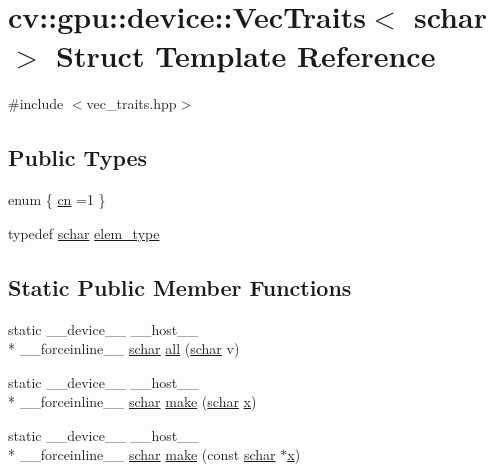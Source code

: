 \hypertarget{structcv_1_1gpu_1_1device_1_1VecTraits_3_01schar_01_4}{\section{cv\-:\-:gpu\-:\-:device\-:\-:Vec\-Traits$<$ schar $>$ Struct Template Reference}
\label{structcv_1_1gpu_1_1device_1_1VecTraits_3_01schar_01_4}
}


{\ttfamily \#include $<$vec\-\_\-traits.\-hpp$>$}

\subsection*{Public Types}
\begin{DoxyCompactItemize}
\item 
enum \{ \hyperlink{structcv_1_1gpu_1_1device_1_1VecTraits_3_01schar_01_4_a23539070e1678601e74686b53e4a974ba37e2cd4dde4f874a49c42458faa85b98}{cn} =1
 \}
\item 
typedef \hyperlink{core_2types__c_8h_a0fd9ce9d735064461bebfe6037026093}{schar} \hyperlink{structcv_1_1gpu_1_1device_1_1VecTraits_3_01schar_01_4_a70d72b11f7b0a4f9704e419f856d35ab}{elem\-\_\-type}
\end{DoxyCompactItemize}
\subsection*{Static Public Member Functions}
\begin{DoxyCompactItemize}
\item 
static \-\_\-\-\_\-device\-\_\-\-\_\- \-\_\-\-\_\-host\-\_\-\-\_\- \\*
\-\_\-\-\_\-forceinline\-\_\-\-\_\- \hyperlink{core_2types__c_8h_a0fd9ce9d735064461bebfe6037026093}{schar} \hyperlink{structcv_1_1gpu_1_1device_1_1VecTraits_3_01schar_01_4_afaaa65cdee3a079da18176f9945e083e}{all} (\hyperlink{core_2types__c_8h_a0fd9ce9d735064461bebfe6037026093}{schar} v)
\item 
static \-\_\-\-\_\-device\-\_\-\-\_\- \-\_\-\-\_\-host\-\_\-\-\_\- \\*
\-\_\-\-\_\-forceinline\-\_\-\-\_\- \hyperlink{core_2types__c_8h_a0fd9ce9d735064461bebfe6037026093}{schar} \hyperlink{structcv_1_1gpu_1_1device_1_1VecTraits_3_01schar_01_4_ac362bca856170d646aa2b40cee7f543f}{make} (\hyperlink{core_2types__c_8h_a0fd9ce9d735064461bebfe6037026093}{schar} \hyperlink{highgui__c_8h_a6150e0515f7202e2fb518f7206ed97dc}{x})
\item 
static \-\_\-\-\_\-device\-\_\-\-\_\- \-\_\-\-\_\-host\-\_\-\-\_\- \\*
\-\_\-\-\_\-forceinline\-\_\-\-\_\- \hyperlink{core_2types__c_8h_a0fd9ce9d735064461bebfe6037026093}{schar} \hyperlink{structcv_1_1gpu_1_1device_1_1VecTraits_3_01schar_01_4_a1d7c57c7df3f2f0c1025e6c3a29b0b3f}{make} (const \hyperlink{core_2types__c_8h_a0fd9ce9d735064461bebfe6037026093}{schar} $\ast$\hyperlink{highgui__c_8h_a6150e0515f7202e2fb518f7206ed97dc}{x})
\end{DoxyCompactItemize}


